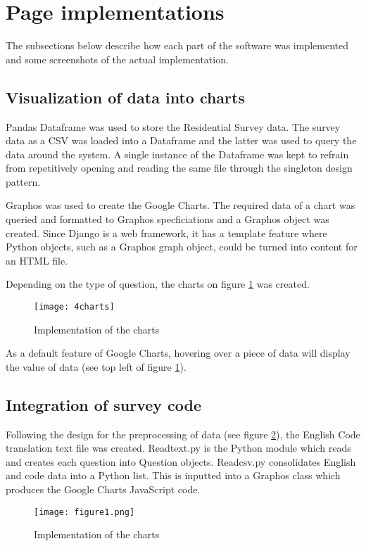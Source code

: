 \section{Page implementations}
The subsections below describe how each part of the software was implemented and some screenshots of the actual implementation.

\subsection{Visualization of data into charts}
Pandas Dataframe was used to store the Residential Survey data. The survey data as a CSV was loaded into a Dataframe and the latter was used to query the data around the system. A single instance of the Dataframe was kept to refrain from repetitively opening and reading the same file through the singleton design pattern.\par

Graphos was used to create the Google Charts. The required data of a chart was queried and formatted to Graphos\textsc{} specficiations and a Graphos object was created. Since Django is a web framework, it has a template feature where Python objects, such as a Graphos graph object, could be turned into content for an HTML file.\par

Depending on the type of question, the charts on figure \ref{fig:4charts} was created.

\begin{figure}[h]
\centering
\texttt{[image: 4charts]}
\caption{Implementation of the charts}
\label{fig:4charts}
\end{figure}

As a default feature of Google Charts, hovering over a piece of data will display the value of data (see top left of figure \ref{fig:4charts}).

\subsection{Integration of survey code}
Following the design for the preprocessing of data (see figure \ref{fig:figure1}), the English Code translation text file was created. Readtext.py is the Python module which reads and creates each question into Question objects. Readcsv.py consolidates English and code data into a Python list. This is inputted into a Graphos class which produces the Google Charts JavaScript code. 

\begin{figure}[h]
\centering
\texttt{[image: figure1.png]}
\caption{Implementation of the charts}
\label{fig:figure1}
\end{figure}

